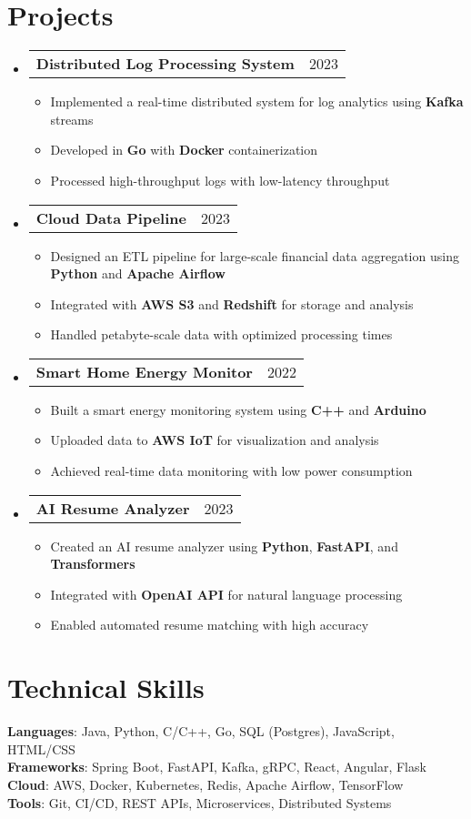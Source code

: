 \documentclass[letterpaper,11pt]{article}
\makeatletter
\newcommand{\resumeItem}[1]{
    \item\small{
            {#1 \vspace{-2pt}}
    }
}
\newcommand{\resumeProjectHeading}[2]{
    \item
    \begin{tabular*}{0.97\textwidth}{l@{\extracolsep{\fill}}r}
    \small#1 & #2 \\
    \end{tabular*}\vspace{-7pt}
}
\newcommand{\resumeSubItem}[1]{\resumeItem{#1}\vspace{-4pt}}
\newcommand{\resumeSubHeadingListStart}{\begin{itemize}[leftmargin=0.15in, label={}]}
\newcommand{\resumeSubHeadingListEnd}{\end{itemize}}
\newcommand{\resumeItemListStart}{\begin{itemize}}
\newcommand{\resumeItemListEnd}{\end{itemize}\vspace{-5pt}}
\makeatother
\begin{document}
\section{Projects}
\resumeSubHeadingListStart
\resumeProjectHeading
{\textbf{Distributed Log Processing System}}{2023}
\resumeItemListStart
\resumeItem{Implemented a real-time distributed system for log analytics using \textbf{Kafka} streams}
\resumeItem{Developed in \textbf{Go} with \textbf{Docker} containerization}
\resumeSubItem{Processed high-throughput logs with low-latency throughput}
\resumeItemListEnd
\resumeProjectHeading
{\textbf{Cloud Data Pipeline}}{2023}
\resumeItemListStart
\resumeItem{Designed an ETL pipeline for large-scale financial data aggregation using \textbf{Python} and \textbf{Apache Airflow}}
\resumeItem{Integrated with \textbf{AWS S3} and \textbf{Redshift} for storage and analysis}
\resumeSubItem{Handled petabyte-scale data with optimized processing times}
\resumeItemListEnd
\resumeProjectHeading
{\textbf{Smart Home Energy Monitor}}{2022}
\resumeItemListStart
\resumeItem{Built a smart energy monitoring system using \textbf{C++} and \textbf{Arduino}}
\resumeItem{Uploaded data to \textbf{AWS IoT} for visualization and analysis}
\resumeSubItem{Achieved real-time data monitoring with low power consumption}
\resumeItemListEnd
\resumeProjectHeading
{\textbf{AI Resume Analyzer}}{2023}
\resumeItemListStart
\resumeItem{Created an AI resume analyzer using \textbf{Python}, \textbf{FastAPI}, and \textbf{Transformers}}
\resumeItem{Integrated with \textbf{OpenAI API} for natural language processing}
\resumeSubItem{Enabled automated resume matching with high accuracy}
\resumeItemListEnd
\resumeSubHeadingListEnd

\section{Technical Skills}
\begin{itemize}[leftmargin=0.15in, label={}]
\small{\item{
\textbf{Languages}{: Java, Python, C/C++, Go, SQL (Postgres), JavaScript, HTML/CSS} \\
\textbf{Frameworks}{: Spring Boot, FastAPI, Kafka, gRPC, React, Angular, Flask} \\
\textbf{Cloud}{: AWS, Docker, Kubernetes, Redis, Apache Airflow, TensorFlow} \\
\textbf{Tools}{: Git, CI/CD, REST APIs, Microservices, Distributed Systems}}}
\end{itemize}
\end{document}
